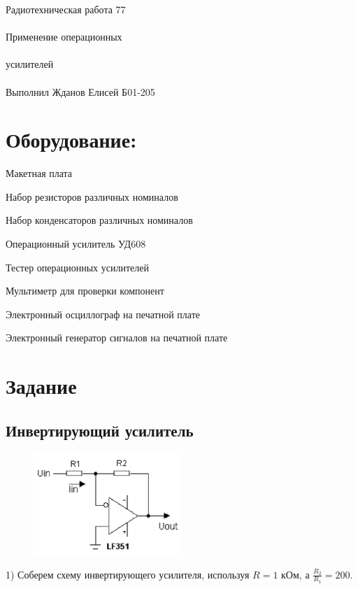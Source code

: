 \documentclass{astroedu-lab}
\begin{document}
\pagestyle{plain}

\begin{problem}{\huge Радиотехническая работа 77\\\\Применение операционных\\\\усилителей\\\\Выполнил Жданов Елисей Б01-205}

\section{Оборудование:}

Макетная плата

Набор резисторов различных номиналов

Набор конденсаторов различных номиналов

Операционный усилитель УД608

Тестер операционных усилителей

Мультиметр для проверки компонент

Электронный осциллограф на печатной плате

Электронный генератор сигналов на печатной плате

\section{Задание}

\subsection{Инвертирующий усилитель}

\begin{figure}[!h]
	\centering
	\includegraphics[width=0.5\textwidth]{invert.png}
	\label{fig:boiler}
\end{figure}

1) Соберем схему инвертирующего усилителя, используя $R = 1$ кОм, а $\frac{R_2}{R_1} = 200$.


\end{problem}
\end{document}

